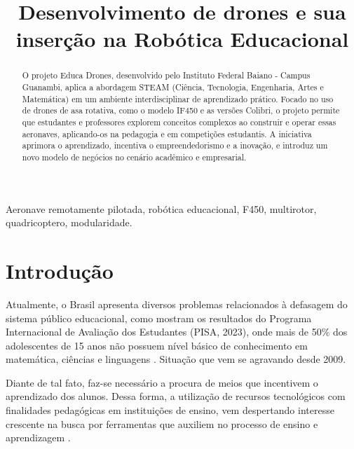 \documentclass[conference]{IEEEtran}
\begin{document}
\title{Desenvolvimento de drones e sua inserção na Robótica Educacional}


\maketitle

\begin{abstract}
O projeto Educa Drones, desenvolvido pelo Instituto Federal Baiano - Campus Guanambi, aplica a abordagem STEAM (Ciência, Tecnologia, Engenharia, Artes e Matemática) em um ambiente interdisciplinar de aprendizado prático. Focado no uso de drones de asa rotativa, como o modelo IF450 e as versões Colibri, o projeto permite que estudantes e professores explorem conceitos complexos ao construir e operar essas aeronaves, aplicando-os na pedagogia e em competições estudantis. A iniciativa aprimora o aprendizado, incentiva o empreendedorismo e a inovação, e introduz um novo modelo de negócios no cenário acadêmico e empresarial.
\end{abstract}

\begin{IEEEkeywords}
Aeronave remotamente pilotada, robótica educacional, F450, multirotor, quadricoptero, modularidade.
\end{IEEEkeywords}

\section{Introdução}

Atualmente, o Brasil apresenta diversos problemas relacionados à defasagem do sistema público educacional, como mostram os resultados do Programa Internacional de Avaliação dos Estudantes (PISA, 2023), onde mais de 50\% dos adolescentes de 15 anos não possuem nível básico de conhecimento em matemática, ciências e linguagens \cite{b6}. Situação que vem se agravando desde 2009.

Diante de tal fato, faz-se necessário a procura de meios que incentivem o aprendizado dos alunos. Dessa forma, a utilização de recursos tecnológicos com finalidades pedagógicas em instituições de ensino, vem despertando interesse crescente na busca por ferramentas que auxiliem no processo de ensino e aprendizagem \cite{b12}.
\end{document}

